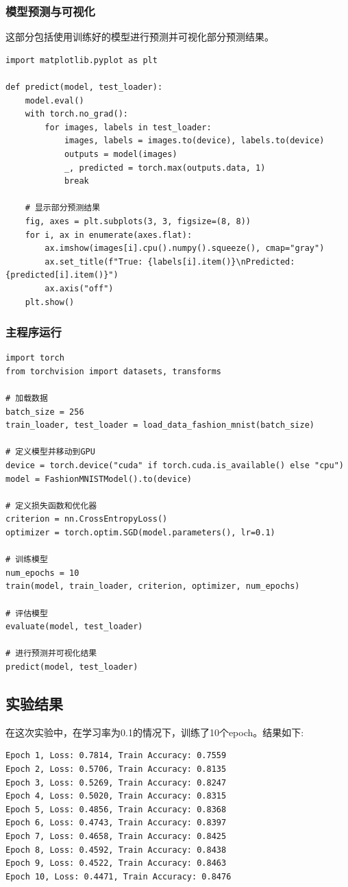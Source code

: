 \documentclass[a4paper,12pt]{article}
\begin{document}
\subsubsection{模型预测与可视化}
这部分包括使用训练好的模型进行预测并可视化部分预测结果。
\begin{lstlisting}
import matplotlib.pyplot as plt

def predict(model, test_loader):
    model.eval()
    with torch.no_grad():
        for images, labels in test_loader:
            images, labels = images.to(device), labels.to(device)
            outputs = model(images)
            _, predicted = torch.max(outputs.data, 1)
            break

    # 显示部分预测结果
    fig, axes = plt.subplots(3, 3, figsize=(8, 8))
    for i, ax in enumerate(axes.flat):
        ax.imshow(images[i].cpu().numpy().squeeze(), cmap="gray")
        ax.set_title(f"True: {labels[i].item()}\nPredicted: {predicted[i].item()}")
        ax.axis("off")
    plt.show()
\end{lstlisting}

\subsubsection{主程序运行}
\begin{lstlisting}
import torch
from torchvision import datasets, transforms

# 加载数据
batch_size = 256
train_loader, test_loader = load_data_fashion_mnist(batch_size)

# 定义模型并移动到GPU
device = torch.device("cuda" if torch.cuda.is_available() else "cpu")
model = FashionMNISTModel().to(device)

# 定义损失函数和优化器
criterion = nn.CrossEntropyLoss()
optimizer = torch.optim.SGD(model.parameters(), lr=0.1)

# 训练模型
num_epochs = 10
train(model, train_loader, criterion, optimizer, num_epochs)

# 评估模型
evaluate(model, test_loader)

# 进行预测并可视化结果
predict(model, test_loader)
\end{lstlisting}

\subsection{实验结果}
在这次实验中，在学习率为0.1的情况下，训练了10个epoch。结果如下:
\begin{lstlisting}
Epoch 1, Loss: 0.7814, Train Accuracy: 0.7559
Epoch 2, Loss: 0.5706, Train Accuracy: 0.8135
Epoch 3, Loss: 0.5269, Train Accuracy: 0.8247
Epoch 4, Loss: 0.5020, Train Accuracy: 0.8315
Epoch 5, Loss: 0.4856, Train Accuracy: 0.8368
Epoch 6, Loss: 0.4743, Train Accuracy: 0.8397
Epoch 7, Loss: 0.4658, Train Accuracy: 0.8425
Epoch 8, Loss: 0.4592, Train Accuracy: 0.8438
Epoch 9, Loss: 0.4522, Train Accuracy: 0.8463
Epoch 10, Loss: 0.4471, Train Accuracy: 0.8476
\end{lstlisting}
\end{document}

